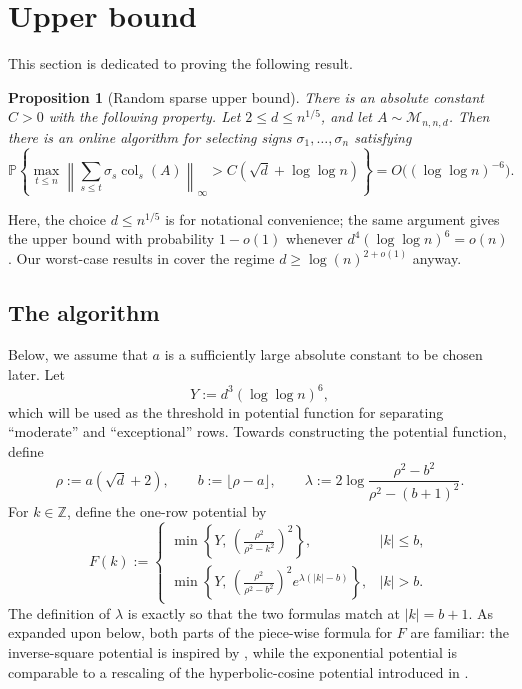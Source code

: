 \documentclass[reqno,english]{amsart}
\newcommand*{\ZZ}{\mathbb Z}
\newcommand*{\PP}{\mathbb P}
\newcommand*{\calM}{\mathcal M}
\newcommand*{\col}{\operatorname{col}}
\newtheorem{proposition}[proposition]{Proposition}
\theoremstyle{definition}
\begin{document}
\section{Upper bound}\label{sec:potential-algorithm}

This section is dedicated to proving the following result.
\begin{proposition}[Random sparse upper bound]\label{prop:sparse-upper}
There is an absolute constant $C>0$ 
with the following property.
Let $2\le d\le n^{1/5}$, and let $A\sim\calM_{n,n,d}$. Then there is an online algorithm for selecting signs $\sigma_1,\dots,\sigma_n$
satisfying
\[
    \PP\left\{
    \max_{t\le n}\left\|\sum_{s\le t}\sigma_s\col_s(A)\right\|_\infty
    >C(\sqrt d+\log\log n)\right\}
    =O\big((\log\log n)^{-6}\big).
\]
\end{proposition}
Here, the choice $d\le n^{1/5}$ is for notational convenience; {the same argument gives the upper bound with probability $1-o(1)$ whenever $d^4(\log\log n)^6=o(n)$}. Our worst-case results in \cite{altschuler-tikhomirov-bf} cover the regime $d \ge \log(n)^{2+o(1)}$ anyway. 

\subsection{The algorithm}

Below, we assume that $a$ is
a sufficiently large absolute constant to be chosen later.
Let
\begin{equation}\label{eq:Y-def}
    Y:=d^3(\log\log n)^6,
\end{equation}
which will be used as the threshold in potential function for separating ``moderate'' and ``exceptional'' rows. Towards constructing the potential function, define
\begin{equation}\label{eq:potential-parameters}
    \rho:=a(\sqrt d+2),\qquad
    b:=\lfloor\rho-a\rfloor,\qquad
    \lambda:=2\log\frac{\rho^2-b^2}{\rho^2-(b+1)^2}.
\end{equation}
For $k\in\ZZ$, define the one-row potential by
\begin{equation}\label{eq:F-def}
F(k):=
\begin{cases}
\displaystyle
\min\!\left\{
    Y,\,
    \left(\frac{\rho^2}{\rho^2-k^2}\right)^2
\right\},
    & |k|\le b,\\[1.1em]
\displaystyle
\min\!\left\{
    Y,\,
    \left(\frac{\rho^2}{\rho^2-b^2}\right)^2
    e^{\lambda(|k|-b)}
\right\},
    & |k|>b.
\end{cases}
\end{equation}
The definition of $\lambda$ is exactly so that the two formulas match at $|k|=b+1$. As expanded upon below, both parts of the piece-wise formula for $F$ are familiar: the inverse-square potential is inspired by \cite{bansal-spencer}, while the exponential potential is {\color{black}comparable to a rescaling} of the hyperbolic-cosine potential introduced in \cite{spencer-online}. 
\end{document}
